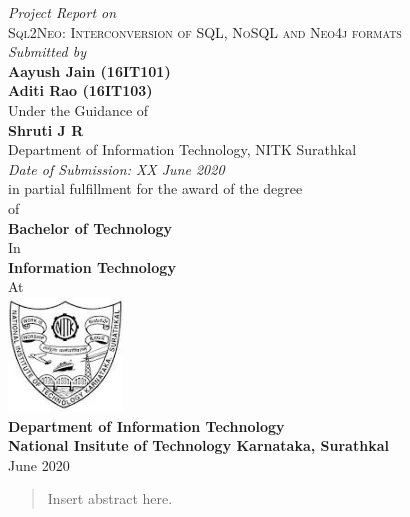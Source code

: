 \documentclass[12pt]{article}
\begin{document}
    \thispagestyle{empty}
    \begin{center}
        \textit{Project Report on}\\
        \vspace{2mm}
        \Large{\textsc{Sql2Neo: Interconversion of SQL, NoSQL and Neo4j formats}}\\
        \vspace{3mm}
        \textit{Submitted by}\\
        \large{\textbf{
            Aayush Jain (16IT101)\\
            Aditi Rao (16IT103)
        }}\\
        \vspace{4mm}
        Under the Guidance of\\
        \textbf{Shruti J R}\\
        Department of Information Technology, NITK Surathkal\\
        \vspace{4mm}
        \textit{Date of Submission: XX June 2020}\\
        \vspace{4mm}
        in partial fulfillment for the award of the degree\\
        of\\
        \textbf{Bachelor of Technology}\\
        In\\
        \textbf{Information Technology}\\
        At
        \vspace{4mm}\\
        \includegraphics[width=1.2in,height=1.2in]{img/nitk.jpg}\\
        \textbf{Department of Information Technology}\\
        \textbf{National Insitute of Technology Karnataka, Surathkal}\\
        June 2020
    \end{center}

    \newpage

    \begin{abstract}
        Insert abstract here.
    \end{abstract}
\end{document}

